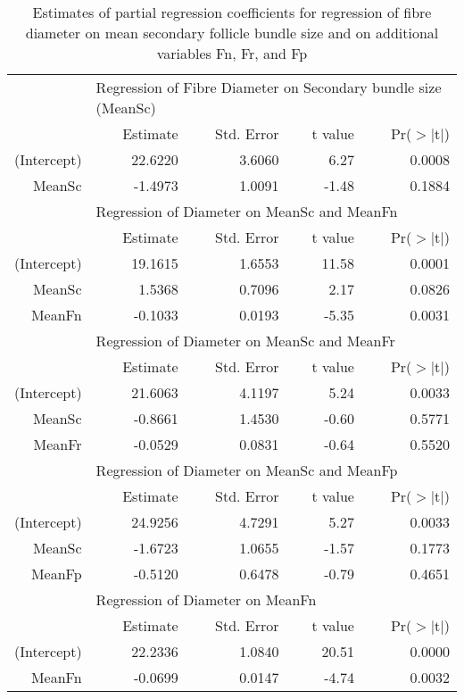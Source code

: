 \begin{table}[ht]
\caption{Estimates of partial regression coefficients for regression of fibre diameter on mean secondary follicle bundle size and on additional variables Fn, Fr, and Fp}
\label{tab:aovreg}
\centering
\begin{tabular}{rrrrr}
  \hline
 & \multicolumn{4}{l}{Regression of Fibre Diameter  on Secondary bundle size (MeanSc)}  \\
 & Estimate & Std. Error & t value & Pr($>$$|$t$|$) \\ 
(Intercept) & 22.6220 & 3.6060 & 6.27 & 0.0008 \\ 
  MeanSc & -1.4973 & 1.0091 & -1.48 & 0.1884 \\ 
   \hline
 & \multicolumn{4}{l}{Regression of Diameter on MeanSc and MeanFn} \\
 & Estimate & Std. Error & t value & Pr($>$$|$t$|$) \\
(Intercept) & 19.1615 & 1.6553 & 11.58 & 0.0001 \\ 
  MeanSc & 1.5368 & 0.7096 & 2.17 & 0.0826 \\ 
  MeanFn & -0.1033 & 0.0193 & -5.35 & 0.0031 \\ 
   \hline
 & \multicolumn{4}{l}{Regression of Diameter on MeanSc and MeanFr} \\
 & Estimate & Std. Error & t value & Pr($>$$|$t$|$) \\
(Intercept) & 21.6063 & 4.1197 & 5.24 & 0.0033 \\ 
  MeanSc & -0.8661 & 1.4530 & -0.60 & 0.5771 \\ 
  MeanFr & -0.0529 & 0.0831 & -0.64 & 0.5520 \\ 
   \hline
 & \multicolumn{4}{l}{Regression of Diameter on MeanSc and MeanFp} \\
 & Estimate & Std. Error & t value & Pr($>$$|$t$|$) \\
(Intercept) & 24.9256 & 4.7291 & 5.27 & 0.0033 \\ 
  MeanSc & -1.6723 & 1.0655 & -1.57 & 0.1773 \\ 
  MeanFp & -0.5120 & 0.6478 & -0.79 & 0.4651 \\ 
   \hline
 & \multicolumn{4}{l}{Regression of Diameter on MeanFn} \\
 & Estimate & Std. Error & t value & Pr($>$$|$t$|$) \\
(Intercept) & 22.2336 & 1.0840 & 20.51 & 0.0000 \\ 
  MeanFn & -0.0699 & 0.0147 & -4.74 & 0.0032 \\ 
   \hline

\end{tabular}
\end{table}

